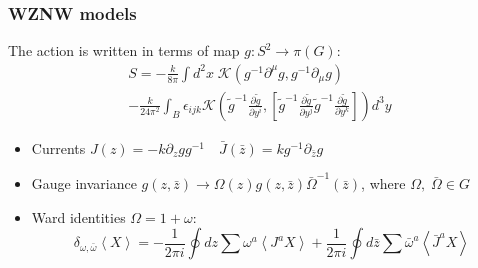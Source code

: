\documentclass[pdftex]{beamer}
\theoremstyle{definition} \newtheorem{Def}{Definition}
\begin{document}
\begin{frame}
  \frametitle{WZNW models}
  The action is written in terms of map $g:S^{2}\to \pi(G)$:
  \begin{multline*}
    S=-\frac{k}{8\pi}\int d^2x\; \mathcal{K} (g^{-1}\partial^{\mu}g, g^{-1} \partial_{\mu}g)  
    \\
    - \frac{k }{24\pi^{2}} \int_{B}\epsilon_{ijk} \mathcal{K}\left(
      \tilde g^{-1}\frac{\partial \tilde g}{\partial y^i},\left[
      \tilde g^{-1}\frac{\partial \tilde g}{\partial y^j}
      \tilde g^{-1}\frac{\partial \tilde g}{\partial y^k}\right]\right) d^3y
  \end{multline*}
  \begin{itemize}
  \item   Currents 
    $J(z)= -k \partial_zg g^{-1}\quad \bar J(\bar z)=k g^{-1}\partial_{\bar z}g$

  \item Gauge invariance
    $ g(z,\bar z)\to \Omega(z)g(z,\bar z)\bar \Omega^{-1}(\bar z)$,    where $\Omega,\;\bar \Omega \in G$

  \item Ward identities $\Omega=1+\omega$:
    \begin{equation*}
      \label{eq:87}
      \delta_{\omega,\bar \omega}\left< X \right>=-\frac{1}{2\pi i}\oint dz \sum\omega^a \left< J^a X\right>+
      \frac{1}{2\pi i} \oint d\bar z \sum \bar \omega^a \left< \bar J^a X\right>
    \end{equation*}
  \end{itemize}
\end{frame}
\end{document}
